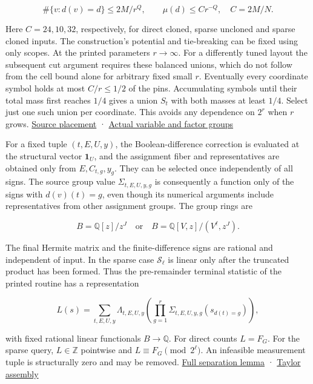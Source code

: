 \documentclass[
  11pt,
]{article}
\begin{document}
\[
 \#\{v:d(v)=d\}\le 2M/r^Q,\qquad \mu(d)\le C r^{-Q},\quad C=2M/N.
\tag{M.1}
\]

Here \(C=24,10,32\), respectively, for direct cloned, sparse uncloned
and sparse cloned inputs. The construction's potential and tie-breaking
can be fixed using only scopes. At the printed parameters
\(r\to\infty\). For a differently tuned layout the subsequent
cut argument requires these balanced unions, which do not follow
from the cell bound alone for arbitrary fixed small \(r\).
Eventually every coordinate symbol holds at most
\(C/r\le1/2\) of the pins. Accumulating symbols until their total mass
first reaches \(1/4\) gives a union \(S_t\) with both masses at least
\(1/4\). Select just one such union per coordinate. This avoids any
dependence on \(2^r\) when \(r\) grows.
\href{https://github.com/openai/math/blob/main/preprints/The-Exponential-Time-Hypothesis-is-False-October-25-2026/build/main_full_version.tex\#L2423-L2510}{Source
placement} ·
\href{https://github.com/openai/math/blob/main/preprints/The-Exponential-Time-Hypothesis-is-False-October-25-2026/build/main_full_version.tex\#L2532-L2578}{Actual
variable and factor groups}

For a fixed tuple \((t,E,U,y)\), the Boolean-difference correction is
evaluated at the structural vector \(\mathbf 1_U\), and the assignment
fiber and representatives are obtained only from \(E,C_{t,g},y_g\). They
can be selected once independently of all signs. The source group value
\(\Sigma_{t,E,U,y,g}\) is consequently a function only of the signs with
\(d(v)(t)=g\), even though its numerical arguments include
representatives from other assignment groups. The group rings are

\[
 B=\mathbb Q[z]/z^J\quad\text{or}\quad B=\mathbb Q[V,z]/(V^\ell,z^J).
\]

The final Hermite matrix and the finite-difference signs are rational
and independent of input. In the sparse case \(\mathcal S_\ell\) is
linear only after the truncated product has been formed. Thus the
pre-remainder terminal statistic of the printed routine has a
representation

\[
 L(s)=\sum_{t,E,U,y}\Lambda_{t,E,U,y}\!\left(\prod_{g=1}^r \Sigma_{t,E,U,y,g}(s_{d(t)=g})\right),
\tag{M.2}
\]

with fixed rational linear functionals \(B\to\mathbb Q\). For direct
counts \(L=F_G\). For the sparse query, \(L\in\mathbb Z\) pointwise and
\(L\equiv F_G\pmod{2^\ell}\). An infeasible measurement tuple is
structurally zero and may be removed.
\href{https://github.com/openai/math/blob/main/preprints/The-Exponential-Time-Hypothesis-is-False-October-25-2026/build/main_full_version.tex\#L1780-L1876}{Full
separation lemma} ·
\href{https://github.com/openai/math/blob/main/preprints/The-Exponential-Time-Hypothesis-is-False-October-25-2026/build/main_full_version.tex\#L1886-L1997}{Taylor
assembly}
\end{document}
